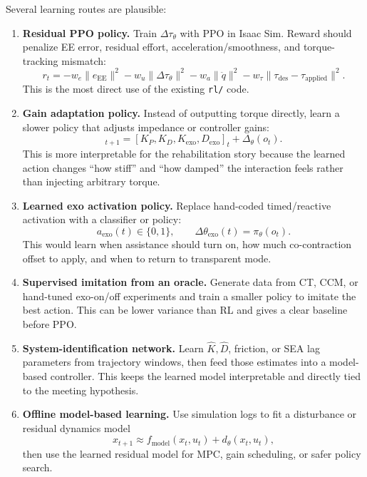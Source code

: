 \documentclass[11pt]{article}
\begin{document}
Several learning routes are plausible:
\begin{enumerate}[leftmargin=1.5em]
    \item \textbf{Residual PPO policy.}  Train \(\Delta\tau_\theta\) with PPO in Isaac Sim.  Reward should penalize EE error, residual effort, acceleration/smoothness, and torque-tracking mismatch:
    \begin{equation}
        r_t = -w_e\|e_{\mathrm{EE}}\|^2
              -w_u\|\Delta\tau_\theta\|^2
              -w_a\|\ddot{q}\|^2
              -w_\tau\|\tau_{\mathrm{des}}-\tau_{\mathrm{applied}}\|^2 .
    \end{equation}
    This is the most direct use of the existing \texttt{rl/} code.

    \item \textbf{Gain adaptation policy.}  Instead of outputting torque directly, learn a slower policy that adjusts impedance or controller gains:
    \begin{equation}
        [K_P,K_D,K_{\mathrm{exo}},D_{\mathrm{exo}}]_{t+1}
        = [K_P,K_D,K_{\mathrm{exo}},D_{\mathrm{exo}}]_t
          + \Delta_\theta(o_t).
    \end{equation}
    This is more interpretable for the rehabilitation story because the learned action changes ``how stiff'' and ``how damped'' the interaction feels rather than injecting arbitrary torque.

    \item \textbf{Learned exo activation policy.}  Replace hand-coded timed/reactive activation with a classifier or policy:
    \begin{equation}
        a_{\mathrm{exo}}(t) \in \{0,1\}, \qquad
        \Delta\theta_{\mathrm{exo}}(t) = \pi_\theta(o_t).
    \end{equation}
    This would learn when assistance should turn on, how much co-contraction offset to apply, and when to return to transparent mode.

    \item \textbf{Supervised imitation from an oracle.}  Generate data from CT, CCM, or hand-tuned exo-on/off experiments and train a smaller policy to imitate the best action.  This can be lower variance than RL and gives a clear baseline before PPO.

    \item \textbf{System-identification network.}  Learn \(\hat{K},\hat{D}\), friction, or SEA lag parameters from trajectory windows, then feed those estimates into a model-based controller.  This keeps the learned model interpretable and directly tied to the meeting hypothesis.

    \item \textbf{Offline model-based learning.}  Use simulation logs to fit a disturbance or residual dynamics model
    \begin{equation}
        x_{t+1} \approx f_{\mathrm{model}}(x_t,u_t) + d_\theta(x_t,u_t),
    \end{equation}
    then use the learned residual model for MPC, gain scheduling, or safer policy search.
\end{enumerate}
\end{document}
